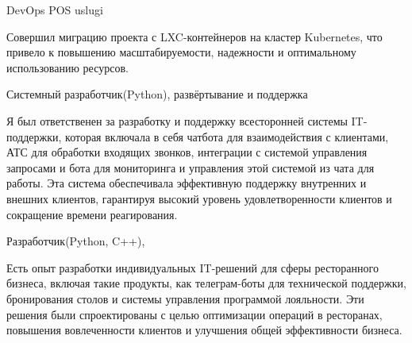 

\begin{cventries}

  \cventry
    {DevOps} %
    {POS uslugi} %
    {} %
    {} %
    {
      \begin{cvitems} %
      Совершил миграцию проекта с LXC-контейнеров на кластер Kubernetes, что привело к повышению масштабируемости, надежности и оптимальному использованию ресурсов.
      \end{cvitems}
    }

  \cventry
    {Системный разработчик(Python), развёртывание и поддержка } %
    {} %
    {} %
    {} %
    {
      \begin{cvitems}
        Я был ответственен за разработку и поддержку всесторонней системы IT-поддержки, которая включала
        в себя чатбота для взаимодействия с клиентами,
        АТС для обработки входящих звонков, интеграции с системой управления запросами и бота для мониторинга
        и управления этой системой из чата для работы.
        Эта система обеспечивала эффективную поддержку внутренних и внешних клиентов,
        гарантируя высокий уровень удовлетворенности клиентов и сокращение времени реагирования.
      \end{cvitems}
    }

  \cventry
    {Разработчик(Python, C++), } %
    {} %
    {} %
    {} %
    {
      \begin{cvitems} %
      Есть опыт разработки индивидуальных IT-решений для сферы ресторанного бизнеса, включая такие продукты,
      как телеграм-боты для технической поддержки, бронирования столов и системы управления программой лояльности.
      Эти решения были спроектированы с целью оптимизации операций в ресторанах, повышения вовлеченности клиентов
      и улучшения общей эффективности бизнеса.
      \end{cvitems}
    }


\end{cventries}
